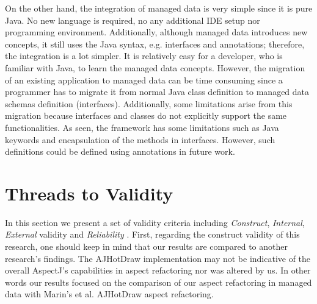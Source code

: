 On the other hand, the integration of managed data is very simple since it is pure Java.
No new language is required, no any additional IDE setup nor programming environment.
Additionally, although managed data introduces new concepts, it still uses the Java syntax, e.g. interfaces and annotations; therefore, the integration is a lot simpler.
It is relatively easy for a developer, who is familiar with Java, to learn the managed data concepts.
However, the migration of an existing application to managed data can be time consuming since a programmer has to migrate it from normal Java class definition  to managed data schemas definition (interfaces).
Additionally, some limitations arise from this migration because interfaces and classes do not explicitly support the same functionalities.
As seen, the framework has some limitations such as Java keywords and encapsulation of the methods in interfaces.
However, such definitions could be defined using annotations in future work.


\section{Threads to Validity}
In this section we present a set of validity criteria including \textit{Construct}, \textit{Internal}, \textit{External} validity and \textit{Reliability} \cite{easterbrook2008selecting}.
First, regarding the construct validity of this research, one should keep in mind that our results are compared to another research's findings. 
The AJHotDraw implementation may not be indicative of the overall AspectJ's capabilities in aspect refactoring nor was altered by us.
In other words our results focused on the comparison of our aspect refactoring in managed data with Marin's et al. AJHotDraw aspect refactoring.

